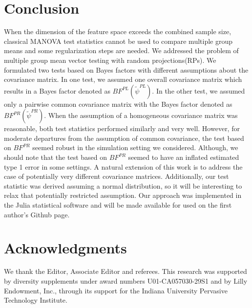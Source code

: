 \documentclass[times,sort&compress,3p]{elsarticle}
\theoremstyle{plain}%
\theoremstyle{definition}
\begin{document}
\section{Conclusion} \label{sec:conclusion}
When the dimension of the feature space exceeds the combined sample size, classical MANOVA test statistics cannot be used to compare multiple group means and some regularization steps are needed. We addressed the problem of multiple group mean vector testing with random projections(RPs). We formulated two tests based on Bayes factors with different assumptions about the covariance matrix. In one test, we assumed one overall covariance matrix which results in a Bayes factor denoted as $BF^{PL}_{}(\widetilde{\psi}^{PL})$. In the other test, we assumed only a pairwise common covariance matrix with the Bayes factor denoted as $BF^{PR}_{}(\widetilde{\psi}^{PR})$. When the assumption of a homogeneous covariance matrix was reasonable, both test statistics performed similarly and very well. However, for moderate departures from the assumption of common covariance, the test based on $BF^{PR}_{}$ seemed robust in the simulation setting we considered. Although, we should note that the test based on $BF^{PR}_{}$ seemed to have an inflated estimated type 1 error in some settings. A natural extension of this work is to address the case of potentially very different covariance matrices. Additionally, our test statistic was derived assuming a normal distribution, so it will be interesting to relax that potentially restricted assumption. Our approach was implemented in the  \textsf{Julia} \cite{bezanson2012julia} statistical software and will be made available for used on the first author's Github page.   

\section*{Acknowledgments}

We thank the Editor, Associate Editor and referees. This research was supported by diversity supplements under award numbers U01-CA057030-29S1 and by Lilly Endowment, Inc., through its support for the Indiana University Pervasive Technology Institute.


\end{document}

